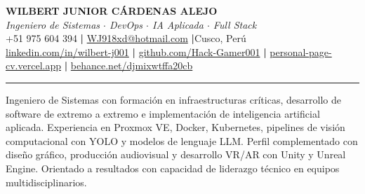 \documentclass[letterpaper,10pt]{article}
\begin{document}
\begin{center}
  {\LARGE\bfseries\color{darktext} WILBERT JUNIOR C\'ARDENAS ALEJO}\\[3pt]
  {\normalsize\color{accentblue}\textit{Ingeniero de Sistemas $\cdot$ DevOps $\cdot$ IA Aplicada $\cdot$ Full Stack}}\\[4pt]
  {\small +51 975 604 394 \enspace\textbf{|}\enspace
    \href{mailto:WJ918xd@hotmail.com}{WJ918xd@hotmail.com} \enspace\textbf{|}\enspace Cusco, Per\'u}\\[2pt]
  {\small
    \href{https://linkedin.com/in/wilbert-j001}{linkedin.com/in/wilbert-j001}
    \enspace\textbf{|}\enspace
    \href{https://github.com/Hack-Gamer001}{github.com/Hack-Gamer001}
    \enspace\textbf{|}\enspace
    \href{https://personal-page-cv.vercel.app}{personal-page-cv.vercel.app}
    \enspace\textbf{|}\enspace
    \href{https://behance.net/djmixwtffa20cb}{behance.net/djmixwtffa20cb}
  }
\end{center}

{\color{cvline}\rule{\linewidth}{0.8pt}}\vspace{2pt}

{\small Ingeniero de Sistemas con formaci\'on en infraestructuras cr\'iticas, desarrollo de software de extremo a extremo e implementaci\'on de inteligencia artificial aplicada. Experiencia en Proxmox VE, Docker, Kubernetes, pipelines de visi\'on computacional con YOLO y modelos de lenguaje LLM. Perfil complementado con dise\~no gr\'afico, producci\'on audiovisual y desarrollo VR/AR con Unity y Unreal Engine. Orientado a resultados con capacidad de liderazgo t\'ecnico en equipos multidisciplinarios.}

\vspace{5pt}{\color{cvline}\rule{\linewidth}{0.8pt}}\vspace{4pt}
\end{document}

